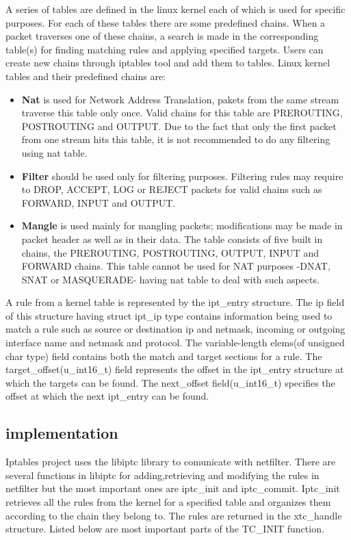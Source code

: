 A series of tables are defined in the linux kernel each of which is used for specific purposes. For each of these tables there are some predefined chains. When a packet traverses one of these chains, a search is made in the corresponding table(s) for finding matching rules and applying specified targets. Users can create new chains through iptables tool and add them to tables.
Linux kernel tables and their predefined chains are:       
\begin{itemize}
\item {\bf Nat} is used for Network Address Translation, pakets from the same stream traverse this table only once. Valid chains for this table are PREROUTING, POSTROUTING and OUTPUT. Due to the fact that only the first packet from one stream hits this table, it is not recommended to do any filtering using nat table.
\item {\bf Filter} should be used only for filtering purposes. Filtering rules may require to DROP, ACCEPT, LOG or REJECT packets for valid chains such as FORWARD, INPUT and OUTPUT.
\item {\bf Mangle} is used mainly for mangling packets; modifications may be made in packet header as well as in their data. The table consists of five built in chains, the PREROUTING, POSTROUTING, OUTPUT, INPUT and FORWARD chains. This table cannot be used for NAT purposes -DNAT, SNAT or MASQUERADE- having nat table to deal with such aspects. 
\end{itemize}

A rule from a kernel table is represented by the ipt_entry structure. The ip field of this structure having struct ipt_ip type  contains information being used to match a rule such as source or destination ip and netmask, incoming or outgoing interface name and netmask and protocol. The variable-length elems(of unsigned char type) field contains both the match and target sections for a rule. The target_offset(u_int16_t) field represents the offset in the ipt_entry structure at which the targets can be found. The next_offset field(u_int16_t) specifies the offset at which the next ipt_entry can be found.   

\subsection{\project implementation}
\label{sub-sec:nat-lklnet}
Iptables project uses the libiptc library to comunicate with netfilter. There are several functions in libiptc for adding,retrieving and modifying the rules in netfilter but the most important ones are iptc_init and iptc_commit. 
Iptc_init retrieves all the rules from the kernel for a specified table and organizes them according to the chain they belong to. The rules are returned in the xtc_handle structure. Listed below are most important parts of the TC_INIT function.

